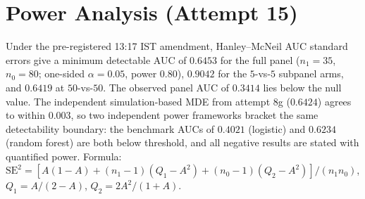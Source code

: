 \documentclass[12pt,a4paper]{article}
\begin{document}
\section{Power Analysis (Attempt 15)}
Under the pre-registered 13:17 IST amendment, Hanley--McNeil AUC standard errors give a minimum detectable AUC of $0.6453$ for the full panel ($n_1=35$, $n_0=80$; one-sided $\alpha=0.05$, power $0.80$), $0.9042$ for the $5$-vs-$5$ subpanel arms, and $0.6419$ at $50$-vs-$50$. The observed panel AUC of $0.3414$ lies below the null value. The independent simulation-based MDE from attempt 8g ($0.6424$) agrees to within $0.003$, so two independent power frameworks bracket the same detectability boundary: the benchmark AUCs of $0.4021$ (logistic) and $0.6234$ (random forest) are both below threshold, and all negative results are stated with quantified power. Formula: $\mathrm{SE}^2 = [A(1-A)+(n_1-1)(Q_1-A^2)+(n_0-1)(Q_2-A^2)]/(n_1 n_0)$, $Q_1 = A/(2-A)$, $Q_2 = 2A^2/(1+A)$.
\end{document}
